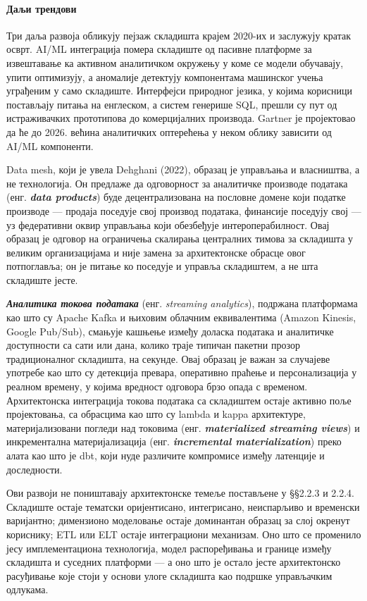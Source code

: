 \paragraph{Даљи трендови}
Три даља развоја обликују пејзаж складишта крајем 2020-их и заслужују кратак осврт. AI/ML интеграција помера складиште од пасивне платформе за извештавање ка активном аналитичком окружењу у коме се модели обучавају, упити оптимизују, а аномалије детектују компонентама машинског учења уграђеним у само складиште. Интерфејси природног језика, у којима корисници постављају питања на енглеском, а систем генерише SQL, прешли су пут од истраживачких прототипова до комерцијалних производа. Gartner је пројектовао да ће до 2026. већина аналитичких оптерећења у неком облику зависити од AI/ML компоненти.

Data mesh, који је увела Dehghani (2022), образац је управљања и власништва, а не технологија. Он предлаже да одговорност за аналитичке производе података (енг. \textbf{\textit{data products}}) буде децентрализована на пословне домене који податке производе — продаја поседује свој производ података, финансије поседују свој — уз федеративни оквир управљања који обезбеђује интероперабилност. Овај образац је одговор на ограничења скалирања централних тимова за складишта у великим организацијама и није замена за архитектонске обрасце овог потпоглавља; он је питање ко поседује и управља складиштем, а не шта складиште јесте.

\textbf{\textit{Аналитика токова података}} (енг. \textit{streaming analytics}), подржана платформама као што су Apache Kafka и њиховим облачним еквивалентима (Amazon Kinesis, Google Pub/Sub), смањује кашњење између доласка података и аналитичке доступности са сати или дана, колико траје типичан пакетни прозор традиционалног складишта, на секунде. Овај образац је важан за случајеве употребе као што су детекција превара, оперативно праћење и персонализација у реалном времену, у којима вредност одговора брзо опада с временом. Архитектонска интеграција токова података са складиштем остаје активно поље пројектовања, са обрасцима као што су lambda и kappa архитектуре, материјализовани погледи над токовима (енг. \textbf{\textit{materialized streaming views}}) и инкрементална материјализација (енг. \textbf{\textit{incremental materialization}}) преко алата као што је dbt, који нуде различите компромисе између латенције и доследности.

Ови развоји не поништавају архитектонске темеље постављене у §§2.2.3 и 2.2.4. Складиште остаје тематски оријентисано, интегрисано, неиспарљиво и временски варијантно; димензионо моделовање остаје доминантан образац за слој окренут кориснику; ETL или ELT остаје интеграциони механизам. Оно што се променило јесу имплементациона технологија, модел распоређивања и границе између складишта и суседних платформи — а оно што је остало јесте архитектонско расуђивање које стоји у основи улоге складишта као подршке управљачким одлукама.

